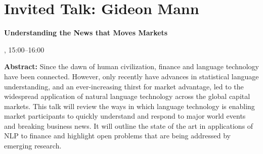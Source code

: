 \section{Invited Talk: Gideon Mann}

\begin{center}
\begin{Large}
    {\bfseries\Large Understanding the News that Moves Markets} \vspace{1em}\par
\end{Large}


\daydateyear, 15:00--16:00 \vspace{1em}\\
\vspace{1em}\par
\end{center}

\noindent
{\bfseries Abstract:} Since the dawn of human civilization, finance and language technology have been connected. However, only recently have advances in statistical language understanding, and an ever-increasing thirst for market advantage, led to the widespread application of natural language technology across the global capital markets. This talk will review the ways in which language technology is enabling market participants to quickly understand and respond to major world events and breaking business news. It will outline the state of the art in applications of NLP to finance and highlight open problems that are being addressed by emerging research.
\vspace{3em}\par 

\vfill
\noindent

